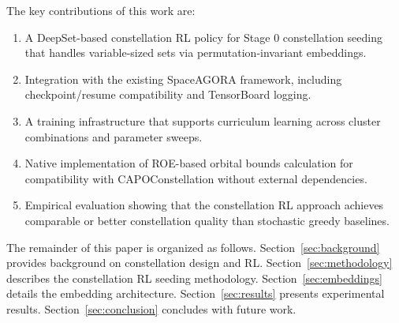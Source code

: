 The key contributions of this work are:
\begin{enumerate}
    \item A DeepSet-based constellation RL policy for Stage 0 constellation seeding that handles variable-sized sets via permutation-invariant embeddings.
    \item Integration with the existing SpaceAGORA framework, including checkpoint/resume compatibility and TensorBoard logging.
    \item A training infrastructure that supports curriculum learning across cluster combinations and parameter sweeps.
    \item Native implementation of ROE-based orbital bounds calculation for compatibility with CAPOConstellation without external dependencies.
    \item Empirical evaluation showing that the constellation RL approach achieves comparable or better constellation quality than stochastic greedy baselines.
\end{enumerate}

The remainder of this paper is organized as follows. Section~\ref{sec:background} provides background on constellation design and RL. Section~\ref{sec:methodology} describes the constellation RL seeding methodology. Section~\ref{sec:embeddings} details the embedding architecture. Section~\ref{sec:results} presents experimental results. Section~\ref{sec:conclusion} concludes with future work.
